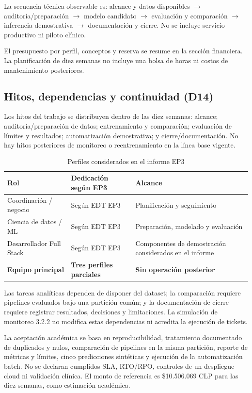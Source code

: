 La secuencia técnica observable es: alcance y datos disponibles $\rightarrow$ auditoría/preparación $\rightarrow$ modelo candidato $\rightarrow$ evaluación y comparación $\rightarrow$ inferencia demostrativa $\rightarrow$ documentación y cierre. No se incluye servicio productivo ni piloto clínico.

El presupuesto por perfil, conceptos y reserva se resume en la sección financiera. La planificación de diez semanas no incluye una bolsa de horas ni costos de mantenimiento posteriores.

\subsection{Hitos, dependencias y continuidad (D14)}

Los hitos del trabajo se distribuyen dentro de las diez semanas: alcance; auditoría/preparación de datos; entrenamiento y comparación; evaluación de límites y resultados; automatización demostrativa; y cierre/documentación. No hay hitos posteriores de monitoreo o reentrenamiento en la línea base vigente.

\begin{table}[H]
  \centering
  \caption{Perfiles considerados en el informe EP3}
  \label{tab:perfiles-ep3}
  \small
  \begin{tabular}{p{4cm}p{4cm}p{5cm}}
    \toprule
    Rol & Dedicación según EP3 & Alcance \\
    \midrule
    Coordinación / negocio & Según EDT EP3 & Planificación y seguimiento \\
    Ciencia de datos / ML & Según EDT EP3 & Preparación, modelado y evaluación \\
    Desarrollador Full Stack & Según EDT EP3 & Componentes de demostración considerados en el informe \\
    \midrule
    \textbf{Equipo principal} & \textbf{Tres perfiles parciales} & \textbf{Sin operación posterior} \\
    \bottomrule
  \end{tabular}
\end{table}

Las tareas analíticas dependen de disponer del dataset; la comparación requiere pipelines evaluados bajo una partición común; y la documentación de cierre requiere registrar resultados, decisiones y limitaciones. La simulación de monitoreo 3.2.2 no modifica estas dependencias ni acredita la ejecución de tickets.

La aceptación académica se basa en reproducibilidad, tratamiento documentado de duplicados y nulos, comparación de pipelines en la misma partición, reporte de métricas y límites, cinco predicciones sintéticas y ejecución de la automatización batch. No se declaran cumplidos SLA, RTO/RPO, controles de un despliegue cloud ni validación clínica. El monto de referencia es \$10.506.069 CLP para las diez semanas, como estimación académica.
